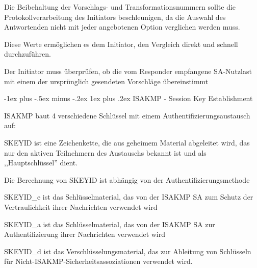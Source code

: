 \documentclass[a4paper]{article}
\makeatletter
\renewcommand{\subsubsection}{\@startsection{subsubsection}{3}{0mm}%
 {-1ex plus -.5ex minus -.2ex}%
 {1ex plus .2ex}%
 {\normalfont\small\bfseries}}
\makeatother
\begin{document}
\begin{multicols}{3}
\begin{itemize*}
\begin{itemize*}
                  \begin{itemize*}
                        \item Die Beibehaltung der Vorschlags- und Transformationsnummern sollte die Protokollverarbeitung des Initiators beschleunigen, da die Auswahl des Antwortenden nicht mit jeder angebotenen Option verglichen werden muss.
                        \item Diese Werte ermöglichen es dem Initiator, den Vergleich direkt und schnell durchzuführen.
                  \end{itemize*}
                  \item
                  Der Initiator muss überprüfen, ob die vom Responder empfangene
                  SA-Nutzlast mit einem der ursprünglich gesendeten Vorschläge
                  übereinstimmt
            \end{itemize*}


            \subsubsection{ISAKMP - Session Key
                  Establishment}

            \begin{itemize*}
                  \item
                  ISAKMP baut 4 verschiedene Schlüssel mit einem
                  Authentifizierungsaustausch auf:

                  \begin{itemize*}
                        \item SKEYID ist eine Zeichenkette, die aus geheimem Material abgeleitet wird, das nur den aktiven Teilnehmern des Austauschs bekannt ist und als ,,Hauptschlüssel'' dient.
                        \begin{itemize*} \item Die Berechnung von SKEYID ist abhängig von der Authentifizierungsmethode \end{itemize*}
                        \item SKEYID\_e ist das Schlüsselmaterial, das von der ISAKMP SA zum Schutz der Vertraulichkeit ihrer Nachrichten verwendet wird
                        \item SKEYID\_a ist das Schlüsselmaterial, das von der ISAKMP SA zur Authentifizierung ihrer Nachrichten verwendet wird
                        \item SKEYID\_d ist das Verschlüsselungsmaterial, das zur Ableitung von Schlüsseln für Nicht-ISAKMP-Sicherheitsassoziationen verwendet wird.
                  \end{itemize*}
            \end{itemize*}



\end{itemize*}
\end{multicols}
\end{document}
